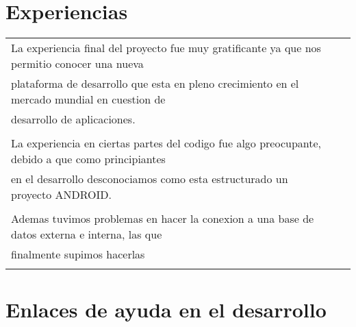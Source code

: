 \documentclass[letterpaper,11pt]{article}
\begin{document}
\section{Experiencias}

\begin{tabular}{lll}

La experiencia final del proyecto fue muy gratificante ya que nos permitio conocer una nueva \\
plataforma de desarrollo que esta en pleno crecimiento en el mercado mundial en cuestion de \\
desarrollo de aplicaciones.\\\\
La experiencia en ciertas partes del codigo fue algo preocupante, debido a que como principiantes \\
en el desarrollo desconociamos como esta estructurado un proyecto ANDROID.\\\\
Ademas tuvimos problemas en hacer la conexion a una base de datos externa e interna, las que\\
finalmente supimos hacerlas\\ \\

\end{tabular}

\section{Enlaces de ayuda en el desarrollo}
\end{document}
